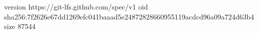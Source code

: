 version https://git-lfs.github.com/spec/v1
oid sha256:7f2626e67dd1269efc041baaad5e24872828660955119acdcd96a09a724d63b4
size 87544

